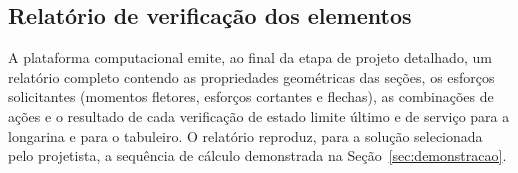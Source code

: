 \begin{appendices}

\section{Relatório de verificação dos elementos}\label{ap:relatorio}

A plataforma computacional emite, ao final da etapa de projeto detalhado, um relatório completo contendo as propriedades geométricas das seções, os esforços solicitantes (momentos fletores, esforços cortantes e flechas), as combinações de ações e o resultado de cada verificação de estado limite último e de serviço para a longarina e para o tabuleiro. O relatório reproduz, para a solução selecionada pelo projetista, a sequência de cálculo demonstrada na Seção~\ref{sec:demonstracao}.


\end{appendices}
